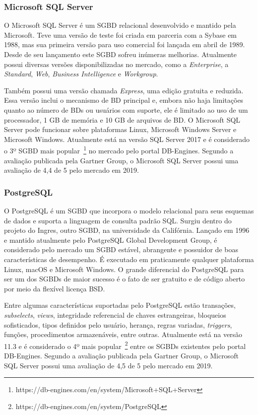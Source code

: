 \subsubsection{Microsoft SQL Server}
O Microsoft SQL Server é um \ac{SGBD} relacional desenvolvido e mantido pela Microsoft. 
Teve uma versão de teste foi criada em parceria com a Sybase em 1988, mas sua primeira versão para uso comercial foi lançada em abril de 1989. 
Desde de seu lançamento este \ac{SGBD} sofreu inúmeras melhorias. 
Atualmente possui diversas versões disponibilizadas no mercado, como a \textit{Enterprise}, a \textit{Standard}, \textit{Web}, \textit{Business Intelligence} e \textit{Workgroup}. 
    
Também possui uma versão chamada \textit{Express}, uma edição gratuita e reduzida. 
Essa versão inclui o mecanismo de \ac{BD} principal e, embora não haja limitações quanto ao número de \acp{BD} ou usuários com suporte, ele é limitado ao uso de um processador, 1 GB de memória e 10 GB de arquivos de \ac{BD}. 
O Microsoft SQL Server pode funcionar sobre plataformas Linux, Microsoft Windows Server e Microsoft Windows.
Atualmente está na versão SQL Server 2017 e é considerado o 3º \ac{SGBD} mais popular~\footnote{https://db-engines.com/en/system/Microsoft+SQL+Server} no mercado pelo portal DB-Engines. 
Segundo a avaliação publicada pela Gartner Group, o Microsoft SQL Server possui uma avaliação de 4,4 de 5 pelo mercado em 2019.

\subsubsection{PostgreSQL}
O PostgreSQL é um \ac{SGBD} que incorpora o modelo relacional para seus esquemas de dados e suporta a linguagem de consulta padrão \ac{SQL}. 
Surgiu dentro do projeto do Ingres, outro \ac{SGBD}, na universidade da Califórnia. 
Lançado em 1996 e mantido atualmente pelo PostgreSQL Global Development Group, é considerado pelo mercado um \ac{SGBD} estável, abrangente e possuidor de boas características de desempenho. 
É executado em praticamente qualquer plataforma Linux, macOS e Microsoft Windows. 
O grande diferencial do PostgreSQL para ser um dos \acp{SGBD} de maior sucesso é o fato de ser gratuito e de código aberto por meio da flexível licença BSD.
    
Entre algumas características suportadas pelo PostgreSQL estão transações, \textit{subselects}, \textit{views}, integridade referencial de chaves estrangeiras, bloqueios sofisticados, tipos definidos pelo usuário, herança, regras variadas, \textit{triggers}, funções, procedimentos armazenáveis, entre outras. 
Atualmente está na versão 11.3 e é considerado o 4º mais popular~\footnote{https://db-engines.com/en/system/PostgreSQL} entre os \acp{SGBD} existentes pelo portal DB-Engines. 
Segundo a avaliação publicada pela Gartner Group, o Microsoft SQL Server possui uma avaliação de 4,5 de 5 pelo mercado em 2019.

